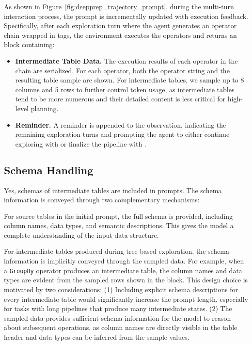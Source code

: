 As shown in Figure~\ref{fig:deepprep_trajectory_prompt}, during the multi-turn interaction process, the prompt is incrementally updated with execution feedback.
Specifically, after each exploration turn where the agent generates an operator chain wrapped in  tags, the environment executes the operators and returns an  block containing:
\begin{itemize}[leftmargin=*]
    \item \textbf{Intermediate Table Data.} The execution results of each operator in the chain are serialized. For each operator, both the operator string and the resulting table sample are shown. For intermediate tables, we sample up to 8 columns and 5 rows to further control token usage, as intermediate tables tend to be more numerous and their detailed content is less critical for high-level planning.
    \item \textbf{Reminder.} A reminder is appended to the observation, indicating the remaining exploration turns and prompting the agent to either continue exploring with  or finalize the pipeline with .
\end{itemize}

\subsection{Schema Handling}
\label{subsec:appendix_schema_handling}

Yes, schemas of intermediate tables are included in prompts. The schema information is conveyed through two complementary mechanisms:

For source tables in the initial prompt, the full schema is provided, including column names, data types, and semantic descriptions. This gives the model a complete understanding of the input data structure.

For intermediate tables produced during tree-based exploration, the schema information is implicitly conveyed through the sampled data. For example, when a \texttt{GroupBy} operator produces an intermediate table, the column names and data types are evident from the sampled rows shown in the  block. This design choice is motivated by two considerations:
(1) Including explicit schema descriptions for every intermediate table would significantly increase the prompt length, especially for tasks with long pipelines that produce many intermediate states.
(2) The sampled data provides sufficient schema information for the model to reason about subsequent operations, as column names are directly visible in the table header and data types can be inferred from the sample values.

